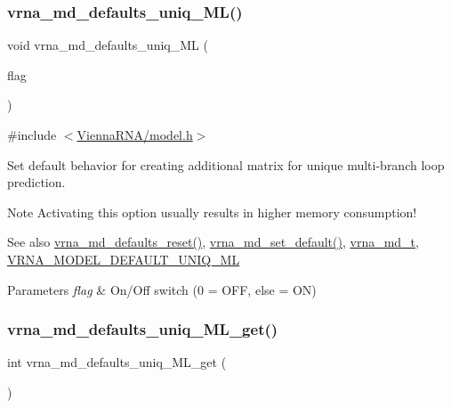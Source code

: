 \subsubsection{\texorpdfstring{vrna\+\_\+md\+\_\+defaults\+\_\+uniq\+\_\+\+M\+L()}{vrna\_md\_defaults\_uniq\_ML()}}
{\footnotesize\ttfamily void vrna\+\_\+md\+\_\+defaults\+\_\+uniq\+\_\+\+ML (\begin{DoxyParamCaption}\item[{int}]{flag }\end{DoxyParamCaption})}



{\ttfamily \#include $<$\mbox{\hyperlink{model_8h}{Vienna\+R\+N\+A/model.\+h}}$>$}



Set default behavior for creating additional matrix for unique multi-\/branch loop prediction. 

\begin{DoxyNote}{Note}
Activating this option usually results in higher memory consumption! 
\end{DoxyNote}
\begin{DoxySeeAlso}{See also}
\mbox{\hyperlink{group__model__details_ga70834424cf804d149937de89f80ceb45}{vrna\+\_\+md\+\_\+defaults\+\_\+reset()}}, \mbox{\hyperlink{group__model__details_ga8ac6ff84936282436f822644bf841f66}{vrna\+\_\+md\+\_\+set\+\_\+default()}}, \mbox{\hyperlink{group__model__details_ga1f8a10e12a0a1915f2a4eff0b28ea17c}{vrna\+\_\+md\+\_\+t}}, \mbox{\hyperlink{group__model__details_ga63f6006a02ba2d89148441f406c309e7}{V\+R\+N\+A\+\_\+\+M\+O\+D\+E\+L\+\_\+\+D\+E\+F\+A\+U\+L\+T\+\_\+\+U\+N\+I\+Q\+\_\+\+ML}} 
\end{DoxySeeAlso}

\begin{DoxyParams}{Parameters}
{\em flag} & On/\+Off switch (0 = O\+FF, else = ON) \\
\hline
\end{DoxyParams}
\mbox{\label{group__model__details_gab48e70fd024bf838404bcbcca0c874a0}} 
\subsubsection{\texorpdfstring{vrna\+\_\+md\+\_\+defaults\+\_\+uniq\+\_\+\+M\+L\+\_\+get()}{vrna\_md\_defaults\_uniq\_ML\_get()}}
{\footnotesize\ttfamily int vrna\+\_\+md\+\_\+defaults\+\_\+uniq\+\_\+\+M\+L\+\_\+get (\begin{DoxyParamCaption}\item[{void}]{ }\end{DoxyParamCaption})}



